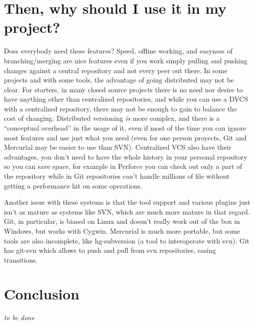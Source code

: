 \documentclass[%
	final,
	notitlepage,
	narroweqnarray,
	inline,
	twoside,
	]{ieee}
\begin{document}
\section{Then, why should I use it in my project?}
Does everybody need these features? Speed, offline working, 
and easyness of branching/merging are nice features even if you work simply pulling 
and pushing changes against a central repository and not every peer out there. In some 
projects and with some tools, the advantage of going distributed may not be clear. 
For starters, in many closed source projects there is no need nor desire to have anything
other than centralized repositories, and while you can use a DVCS with a centralized
repository, there may not be enough to gain to balance the cost of changing. Distributed 
versioning \emph{is} more complex, and there is a ``conceptual overhead'' in the usage 
of it, even if most of the time you can ignore most features and use just what you need 
(even for one person proyects, Git and Mercurial may be easier to use than SVN).
Centralized VCS also have their advantages, you don't need to have the whole history in your 
personal repository so you can save space, for example in Perforce you can check out only a part of the 
repository\cite{perforceclientspec} while in Git repositories can't handle millions of file 
without getting a performance hit on some operations\cite{linusgit}.

Another issue with these systems is that the tool support and various plugins just isn't as 
mature as systems like SVN, which are much more mature in that regard. Git, in particular, is 
biased on Linux and doesn't really work out of the box in Windows, but works with Cygwin. 
Mercurial is much more portable, but some tools are also incomplete, like hg-subversion (a tool 
to interoperate with svn). Git has git-svn which allows to push and pull from svn repositories, 
easing transitions.


\section{Conclusion}

\emph{to be done}

\end{document}
